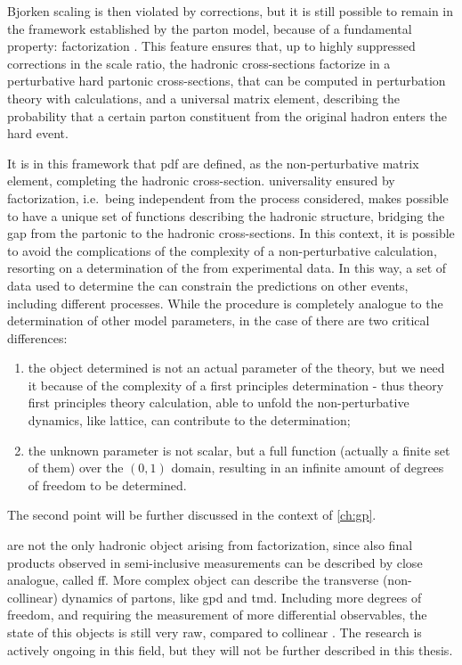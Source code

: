 Bjorken scaling is then violated by \qcd corrections, but it is still possible
to remain in the framework established by the parton model, because of a
fundamental \qcd property: factorization \cite{Collins:1989gx}.
%
This feature ensures that, up to highly suppressed corrections in the scale
ratio, the hadronic cross-sections factorize in a perturbative hard partonic
cross-sections, that can be computed in perturbation theory with \pqft
calculations, and a universal matrix element, describing the probability that a
certain parton constituent from the original hadron enters the hard event.

It is in this framework that \acrfull{pdf} are defined, as the non-perturbative
matrix element, completing the hadronic cross-section.
\pdf universality ensured by factorization, i.e.\ being independent from the
process considered, makes possible to have a unique set of functions describing
the hadronic structure, bridging the gap from the partonic to the hadronic
cross-sections.
%
In this context, it is possible to avoid the complications of the complexity of
a non-perturbative calculation, resorting on a determination of the \pdfs
from experimental data.
In this way, a set of data used to determine the \pdfs can constrain the
predictions on other events, including different processes.
%
While the procedure is completely analogue to the determination of other \sm
model parameters, in the case of \pdfs there are two critical differences:
\begin{enumerate}
	\item the object determined is not an actual parameter of the theory, but
	      we need it because of the complexity of a first principles
	      determination - thus theory first principles theory calculation, able
	      to unfold the non-perturbative dynamics, like lattice, can contribute
	      to the \pdfs determination;
	\item the unknown parameter is not scalar, but a full function (actually a
	      finite set of them) over the $(0,1)$ domain, resulting in an infinite
	      amount of degrees of freedom to be determined.
\end{enumerate}
The second point will be further discussed in the context of \cref{ch:gp}.

\pdfs are not the only hadronic object arising from factorization, since also
final products observed in semi-inclusive measurements can be described by
close analogue, called \acrfull{ff}.
%
More complex object can describe the transverse (non-collinear) dynamics of
partons, like \acrfull{gpd} and \acrfull{tmd}.
Including more degrees of freedom, and requiring the measurement of more
differential observables, the state of this objects is still very raw, compared
to collinear \pdfs.
%
The research is actively ongoing in this field, but they will not be further
described in this thesis.

